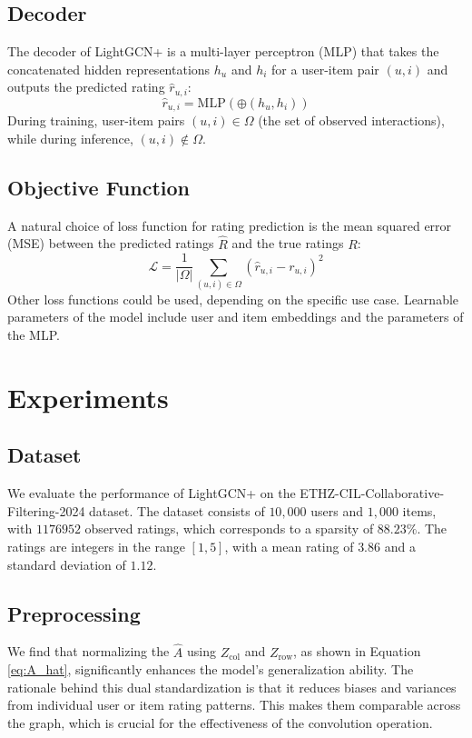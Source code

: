 \documentclass[10pt,conference,compsocconf]{IEEEtran}
\begin{document}
\subsection{Decoder}
The decoder of LightGCN+ is a multi-layer perceptron (MLP) that takes the concatenated hidden representations \( h_u \) and \( h_i \) for a user-item pair \((u, i)\) and outputs the predicted rating \(\hat{r}_{u,i}\):
\begin{equation}
    \hat{r}_{u,i} = \text{MLP}(\oplus(h_u, h_i))
\end{equation}
During training, user-item pairs \((u, i) \in \Omega\) (the set of observed interactions), while during inference, \((u, i) \notin \Omega\).

\subsection{Objective Function}
A natural choice of loss function for rating prediction is the mean squared error (MSE) between the predicted ratings \(\hat{R}\) and the true ratings \(R\):
\begin{equation}
    \mathcal{L} = \frac{1}{|\Omega|} \sum_{(u,i) \in \Omega} (\hat{r}_{u,i} - r_{u,i})^2
\end{equation}
Other loss functions could be used, depending on the specific use case.
Learnable parameters of the model include user and item embeddings and the parameters of the MLP.

\section{Experiments}

\subsection{Dataset}

We evaluate the performance of LightGCN+ on the ETHZ-CIL-Collaborative-Filtering-2024 dataset.
The dataset consists of $10,000$ users and $1,000$ items, with $1176952$ observed ratings, which corresponds to a sparsity of $88.23 \%$.
The ratings are integers in the range $[1, 5]$, with a mean rating of $3.86$ and a standard deviation of $1.12$.

\subsection{Preprocessing}
We find that normalizing the $\hat{A}$ using $Z_{\text{col}}$ and $Z_{\text{row}}$, as shown in Equation \ref{eq:A_hat}, significantly enhances the model's generalization ability. 
The rationale behind this dual standardization is that it reduces biases and variances from individual user or item rating patterns. This makes them comparable across the graph, which is crucial for the effectiveness of the convolution operation.
\end{document}
